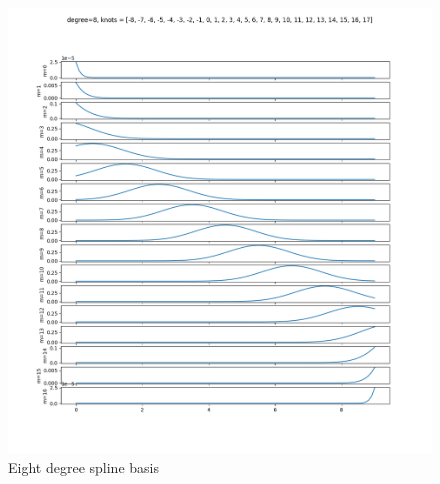 \begin{figure}[ht]
  \includegraphics[width=\linewidth]{./chap5_trajectory_planning/figures/spline_basis_8}
  \caption{Eight degree spline basis}
  \label{fig:spline_basis_8}  
\end{figure}

\clearpage

\par{}

